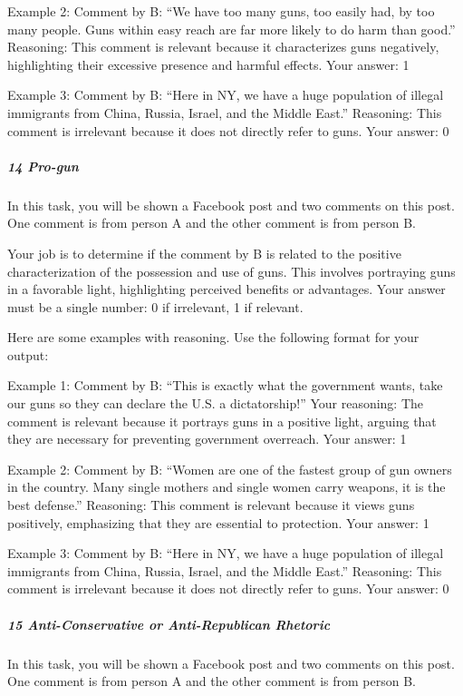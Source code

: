 \documentclass[
  letterpaper,
  DIV=11,
  numbers=noendperiod]{scrartcl}
\let\oldsubparagraph\subparagraph
\renewcommand{\subparagraph}[1]{\oldsubparagraph{#1}\mbox{}}
\begin{document}
Example 2: Comment by B: ``We have too many guns, too easily had, by too
many people. Guns within easy reach are far more likely to do harm than
good.'' Reasoning: This comment is relevant because it characterizes
guns negatively, highlighting their excessive presence and harmful
effects. Your answer: 1

Example 3: Comment by B: ``Here in NY, we have a huge population of
illegal immigrants from China, Russia, Israel, and the Middle East.''
Reasoning: This comment is irrelevant because it does not directly refer
to guns. Your answer: 0

\hypertarget{pro-gun}{%
\subparagraph{14 Pro-gun}\label{pro-gun}}

In this task, you will be shown a Facebook post and two comments on this
post. One comment is from person A and the other comment is from person
B.

Your job is to determine if the comment by B is related to the positive
characterization of the possession and use of guns. This involves
portraying guns in a favorable light, highlighting perceived benefits or
advantages. Your answer must be a single number: 0 if irrelevant, 1 if
relevant.

Here are some examples with reasoning. Use the following format for your
output:

Example 1: Comment by B: ``This is exactly what the government wants,
take our guns so they can declare the U.S. a dictatorship!'' Your
reasoning: The comment is relevant because it portrays guns in a
positive light, arguing that they are necessary for preventing
government overreach. Your answer: 1

Example 2: Comment by B: ``Women are one of the fastest group of gun
owners in the country. Many single mothers and single women carry
weapons, it is the best defense.'' Reasoning: This comment is relevant
because it views guns positively, emphasizing that they are essential to
protection. Your answer: 1

Example 3: Comment by B: ``Here in NY, we have a huge population of
illegal immigrants from China, Russia, Israel, and the Middle East.''
Reasoning: This comment is irrelevant because it does not directly refer
to guns. Your answer: 0

\hypertarget{anti-conservative-or-anti-republican-rhetoric}{%
\subparagraph{15 Anti-Conservative or Anti-Republican
Rhetoric}\label{anti-conservative-or-anti-republican-rhetoric}}

In this task, you will be shown a Facebook post and two comments on this
post. One comment is from person A and the other comment is from person
B.
\end{document}
